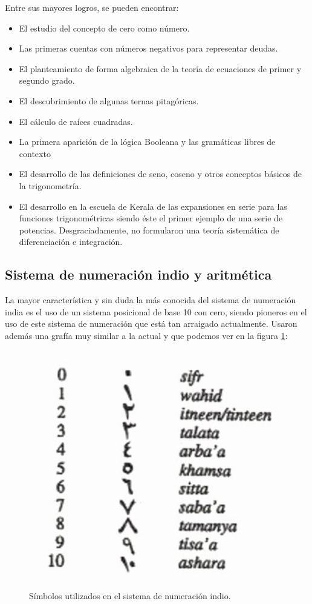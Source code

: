 \documentclass[a4paper, 11pt]{article}
\begin{document}
	Entre sus mayores logros, se pueden encontrar:
	\begin{itemize}
		\item El estudio del concepto de cero como número.
		\item Las primeras cuentas con números negativos para representar deudas.
		\item El planteamiento de forma algebraica de la teoría de ecuaciones de primer y segundo grado.
		\item El descubrimiento de algunas ternas pitagóricas.
		\item El cálculo de raíces cuadradas.
		\item La primera aparición de la lógica Booleana y las gramáticas libres de contexto
		\item El desarrollo de las definiciones de seno, coseno y otros conceptos básicos de la trigonometría.
		\item El desarrollo en la escuela de Kerala de las expansiones en serie para las funciones trigonométricas siendo
		éste el primer ejemplo de una serie de potencias. Desgraciadamente, no formularon una teoría sistemática de
		diferenciación e integración.
	\end{itemize}

	\subsection{Sistema de numeración indio y aritmética}
		La mayor característica y sin duda la más conocida del sistema de numeración india es el uso de un sistema posicional
		de base 10 con cero, siendo pioneros en el uso de este sistema de numeración que está tan arraigado actualmente.
		Usaron además una grafía muy similar a la actual y que podemos ver en la figura \ref{fig:ind_numbers}:
		\begin{figure}[!ht]
			\centering
			\includegraphics[width = 14cm]{indian_numbers.jpg}
			\caption{Símbolos utilizados en el sistema de numeración indio.}
			\label{fig:ind_numbers}
		\end{figure}
\end{document}
